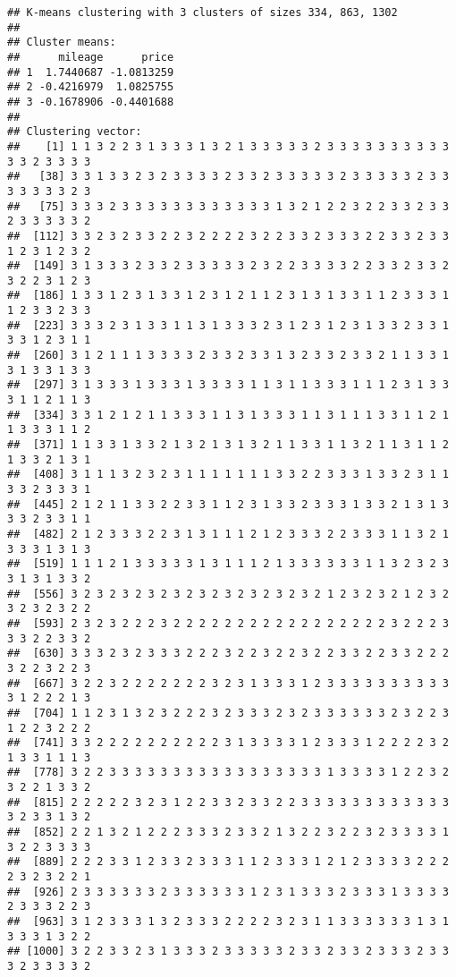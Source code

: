 \documentclass[
]{article}
\begin{document}
\begin{verbatim}
## K-means clustering with 3 clusters of sizes 334, 863, 1302
## 
## Cluster means:
##      mileage      price
## 1  1.7440687 -1.0813259
## 2 -0.4216979  1.0825755
## 3 -0.1678906 -0.4401688
## 
## Clustering vector:
##    [1] 1 1 3 2 2 3 1 3 3 3 1 3 2 1 3 3 3 3 3 2 3 3 3 3 3 3 3 3 3 3 3 3 2 3 3 3 3
##   [38] 3 3 1 3 3 2 3 2 3 3 3 3 2 3 3 2 3 3 3 3 3 2 3 3 3 3 3 2 3 3 3 3 3 3 3 2 3
##   [75] 3 3 3 2 3 3 3 3 3 3 3 3 3 3 3 3 1 3 2 1 2 2 3 2 2 3 3 2 3 3 2 3 3 3 3 3 2
##  [112] 3 3 2 3 2 3 3 2 2 3 2 2 2 2 3 2 2 3 3 2 3 3 3 2 2 3 3 2 3 3 1 2 3 1 2 3 2
##  [149] 3 1 3 3 3 2 3 3 2 3 3 3 3 3 2 3 2 2 3 3 3 3 2 2 3 3 2 3 3 2 3 2 2 3 1 2 3
##  [186] 1 3 3 1 2 3 1 3 3 1 2 3 1 2 1 1 2 3 1 3 1 3 3 1 1 2 3 3 3 1 1 2 3 3 2 3 3
##  [223] 3 3 3 2 3 1 3 3 1 1 3 1 3 3 3 2 3 1 2 3 1 2 3 1 3 3 2 3 3 1 3 3 1 2 3 1 1
##  [260] 3 1 2 1 1 1 3 3 3 3 2 3 3 2 3 3 1 3 2 3 3 2 3 3 2 1 1 3 3 1 3 1 3 3 1 3 3
##  [297] 3 1 3 3 3 1 3 3 3 1 3 3 3 3 1 1 3 1 1 3 3 3 1 1 1 2 3 1 3 3 3 1 1 2 1 1 3
##  [334] 3 3 1 2 1 2 1 1 3 3 3 1 1 3 1 3 3 3 1 1 3 1 1 1 3 3 1 1 2 1 1 3 3 3 1 1 2
##  [371] 1 1 3 3 1 3 3 2 1 3 2 1 3 1 3 2 1 1 3 3 1 1 3 2 1 1 3 1 1 2 1 3 3 2 1 3 1
##  [408] 3 1 1 1 3 2 3 2 3 1 1 1 1 1 1 1 3 3 2 2 3 3 3 1 3 3 2 3 1 1 3 3 2 3 3 3 1
##  [445] 2 1 2 1 1 3 3 2 2 3 3 1 1 2 3 1 3 3 2 3 3 3 1 3 3 2 1 3 1 3 3 3 2 3 3 1 1
##  [482] 2 1 2 3 3 3 2 2 3 1 3 1 1 1 2 1 2 3 3 3 2 2 3 3 3 1 1 3 2 1 3 3 3 1 3 1 3
##  [519] 1 1 1 2 1 3 3 3 3 3 1 3 1 1 1 2 1 3 3 3 3 3 3 1 1 3 2 3 2 3 3 1 3 1 3 3 2
##  [556] 3 2 3 2 3 2 3 2 3 2 3 2 3 2 3 2 3 2 3 2 1 2 3 2 3 2 1 2 3 2 3 2 3 2 3 2 2
##  [593] 2 3 2 3 2 2 2 3 2 2 2 2 2 2 2 2 2 2 2 2 2 2 2 2 2 3 2 2 2 3 3 3 2 2 3 3 2
##  [630] 3 3 3 2 3 2 3 3 3 2 2 2 3 2 2 3 2 2 3 2 2 3 3 2 2 3 3 2 2 2 3 2 2 3 2 2 3
##  [667] 3 2 2 3 2 2 2 2 2 2 2 3 2 3 1 3 3 3 1 2 3 3 3 3 3 3 3 3 3 3 3 1 2 2 2 1 3
##  [704] 1 1 2 3 1 3 2 3 2 2 2 3 2 3 3 3 2 3 2 3 3 3 3 3 3 2 3 2 2 3 1 2 2 3 2 2 2
##  [741] 3 3 2 2 2 2 2 2 2 2 2 2 3 1 3 3 3 3 1 2 3 3 3 1 2 2 2 2 3 2 1 3 3 1 1 1 3
##  [778] 3 2 2 3 3 3 3 3 3 3 3 3 3 3 3 3 3 3 3 3 1 3 3 3 3 1 2 2 3 2 3 2 2 1 3 3 2
##  [815] 2 2 2 2 2 3 2 3 1 2 2 3 3 2 3 3 2 2 3 3 3 3 3 3 3 3 3 3 3 3 3 2 3 3 1 3 2
##  [852] 2 2 1 3 2 1 2 2 2 3 3 3 2 3 3 2 1 3 2 2 3 2 2 3 2 3 3 3 3 1 3 2 2 3 3 3 3
##  [889] 2 2 2 3 3 1 2 3 3 2 3 3 3 1 1 2 3 3 3 1 2 1 2 3 3 3 3 2 2 2 2 3 2 3 2 2 1
##  [926] 2 3 3 3 3 3 3 2 3 3 3 3 3 3 1 2 3 1 3 3 3 2 3 3 3 1 3 3 3 3 2 3 3 3 2 2 3
##  [963] 3 1 2 3 3 3 1 3 2 3 3 3 2 2 2 2 3 2 3 1 1 3 3 3 3 3 3 1 3 1 3 3 3 1 3 2 2
## [1000] 3 2 2 3 3 2 3 1 3 3 3 2 3 3 3 3 3 2 3 3 2 3 3 2 3 3 3 2 3 3 3 2 3 3 3 3 2

\end{verbatim}
\end{document}
